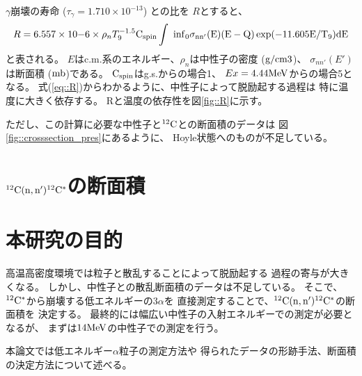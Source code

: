 $\gamma$崩壊の寿命 ($\tau_{\gamma} = 1.710\times10^{-13}$) との比を
$R$とすると、
\begin{equation}
  R = 6.557\times10{-6}\times\rho_{n}T_{9}^{-1.5}\rm{C}_{\rm{spin}}
  \int~{\inf}_{0}\sigma_{nn'}(E)(E-Q)\exp(-11.605E/T_{9})dE
  \label{eq::R}
\end{equation}
と表される。
$E$はc.m.系のエネルギー、$\rho_{n}$は中性子の密度 ($\rm{g/cm3}$)、
$\sigma_{nn'}(E')$は断面積 ($\rm{mb}$)である。
$\rm{C}_{\rm{spin}}$はg.s.からの場合1、
$Ex = 4.44\rm{MeV}$からの場合5となる。
式(\ref{eq::R})からわかるように、中性子によって脱励起する過程は
特に温度に大きく依存する。
Rと温度の依存性を図\ref{fig::R}に示す。

ただし、この計算に必要な中性子と${}^{12}\rm{C}$との断面積のデータは
図\ref{fig::crosssection_pres}にあるように、
Hoyle状態へのものが不足している。

\section{${}^{12}\rm{C}(n,n'){}^{12}\rm{C}^{*}$の断面積}


\section{本研究の目的}
高温高密度環境では粒子と散乱することによって脱励起する
過程の寄与が大きくなる。
しかし、中性子との散乱断面積のデータは不足している。
そこで、${}^{12}\rm{C}^{*}$から崩壊する低エネルギーの3$\alpha$を
直接測定することで、${}^{12}\rm{C}(n,n'){}^{12}\rm{C}^{*}$の断面積を
決定する。
最終的には幅広い中性子の入射エネルギーでの測定が必要となるが、
まずは$14\rm{MeV}$の中性子での測定を行う。

本論文では低エネルギー$\alpha$粒子の測定方法や
得られたデータの形跡手法、断面積の決定方法について述べる。
